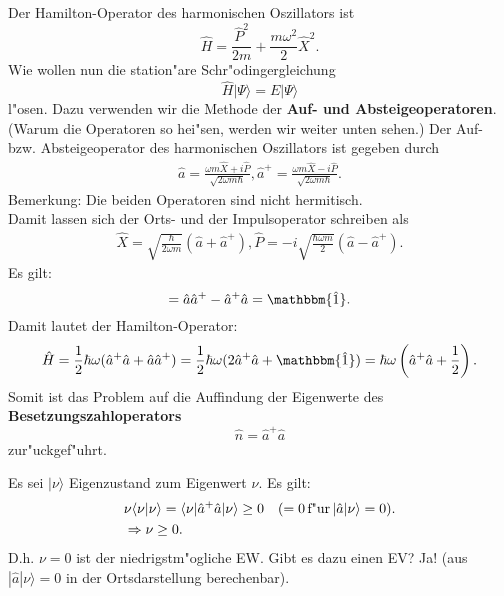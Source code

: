 
Der Hamilton-Operator des harmonischen Oszillators ist
\begin{equation}
	\hat H = \frac{\hat  P^2}{2m} + \frac{m\omega^2}{2}\hat X^2.
\end{equation}
Wie wollen nun die station"are Schr"odingergleichung 
\begin{equation}
	\hat H |\Psi\rangle = E|\Psi \rangle
\end{equation}
l"osen. Dazu verwenden wir die Methode der \textbf{Auf- und Absteigeoperatoren}.
(Warum die Operatoren so hei"sen, werden wir weiter unten sehen.)
Der Auf- bzw. Absteigeoperator des harmonischen Oszillators ist gegeben durch
\begin{align}
	\hat a = \frac{\omega m \hat X + i \hat P}{\sqrt{2\omega m \hbar}},
	\hat a^+ = \frac{\omega m \hat X-i\hat P}{\sqrt{2\omega m \hbar}}.
\end{align}
Bemerkung: Die beiden Operatoren sind nicht hermitisch.\\
Damit lassen sich der Orts- und der Impulsoperator schreiben als
\begin{align}
	\hat X = \sqrt{\frac{\hbar}{2\omega m}}(\hat a +\hat a^+),
	\hat P = -i \sqrt{\frac{\hbar \omega m}{2}}(\hat a -\hat a^+).
\end{align}
Es gilt:
\begin{equation}
	[\hat a,\hat a^+] = \hat a \hat a^+ - \hat a^+ \hat a = \mathbbm{\hat 1}.
\end{equation}
Damit lautet der Hamilton-Operator:
\begin{equation}
	\hat H = \frac{1}{2}\hbar \omega (\hat a^+\hat a + \hat a\hat a^+) = \frac{1}{2}\hbar \omega (2\hat a^+\hat a +
	\mathbbm{\hat 1}) = \hbar \omega \left(\hat a^+ \hat a + \frac{1}{2}\right).
\end{equation}
Somit ist das Problem auf die Auffindung der Eigenwerte des \textbf{Besetzungszahloperators}
\begin{equation}
	\hat n = \hat a^+\hat a
\end{equation}
zur"uckgef"uhrt.

Es sei $|\nu\rangle$ Eigenzustand zum Eigenwert $\nu$. Es gilt:
\begin{equation}
\begin{split}
	&\nu \langle \nu|\nu \rangle = \langle \nu|\hat a^+ \hat a|\nu\rangle \geq 0 \quad (=0 \, \textnormal{f"ur} \, |\hat a |\nu\rangle=0). 
	\\
	&\Rightarrow \nu \geq 0.
\end{split}
\end{equation}
D.h. $\nu=0$ ist der niedrigstm"ogliche EW. Gibt es dazu einen EV? Ja! (aus $|\hat a|\nu \rangle =0$ in der Ortsdarstellung
berechenbar). 

